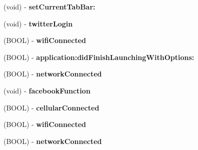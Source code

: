 \begin{DoxyCompactItemize}
\item 
\hypertarget{interface_staff_it_to_me_app_delegate_a6ec6c5f48f0b205b94e1c6c9d80d5e81}{
(void) -\/ {\bfseries set\-Current\-Tab\-Bar\-:}}
\label{interface_staff_it_to_me_app_delegate_a6ec6c5f48f0b205b94e1c6c9d80d5e81}

\item 
\hypertarget{interface_staff_it_to_me_app_delegate_ad819326d8f09598671310aaf286adbf3}{
(void) -\/ {\bfseries twitter\-Login}}
\label{interface_staff_it_to_me_app_delegate_ad819326d8f09598671310aaf286adbf3}

\item 
\hypertarget{interface_staff_it_to_me_app_delegate_a8e122bb24cdb207df8c014b664ee6ae8}{
(\-B\-O\-O\-L) -\/ {\bfseries wifi\-Connected}}
\label{interface_staff_it_to_me_app_delegate_a8e122bb24cdb207df8c014b664ee6ae8}

\item 
\hypertarget{interface_staff_it_to_me_app_delegate_a9ddd6188b7214aa7e6ae528adf18d23c}{
(\-B\-O\-O\-L) -\/ {\bfseries application\-:did\-Finish\-Launching\-With\-Options\-:}}
\label{interface_staff_it_to_me_app_delegate_a9ddd6188b7214aa7e6ae528adf18d23c}

\item 
\hypertarget{interface_staff_it_to_me_app_delegate_a7a18fc4efea7fcf16760a5f9d044f573}{
(\-B\-O\-O\-L) -\/ {\bfseries network\-Connected}}
\label{interface_staff_it_to_me_app_delegate_a7a18fc4efea7fcf16760a5f9d044f573}

\item 
\hypertarget{interface_staff_it_to_me_app_delegate_a0856eda14fe0f9d9b7ede3ea68cad259}{
(void) -\/ {\bfseries facebook\-Function}}
\label{interface_staff_it_to_me_app_delegate_a0856eda14fe0f9d9b7ede3ea68cad259}

\item 
\hypertarget{interface_staff_it_to_me_app_delegate_acf8ef7db277c825c37e01340f0253970}{
(\-B\-O\-O\-L) -\/ {\bfseries cellular\-Connected}}
\label{interface_staff_it_to_me_app_delegate_acf8ef7db277c825c37e01340f0253970}

\item 
\hypertarget{interface_staff_it_to_me_app_delegate_a8e122bb24cdb207df8c014b664ee6ae8}{
(\-B\-O\-O\-L) -\/ {\bfseries wifi\-Connected}}
\label{interface_staff_it_to_me_app_delegate_a8e122bb24cdb207df8c014b664ee6ae8}

\item 
\hypertarget{interface_staff_it_to_me_app_delegate_a7a18fc4efea7fcf16760a5f9d044f573}{
(\-B\-O\-O\-L) -\/ {\bfseries network\-Connected}}
\label{interface_staff_it_to_me_app_delegate_a7a18fc4efea7fcf16760a5f9d044f573}


\end{DoxyCompactItemize}
